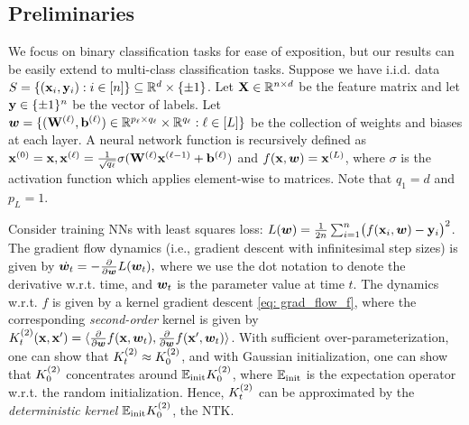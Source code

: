 
\subsection{Preliminaries}

We focus on binary classification tasks for ease of exposition, but our results can be easily extend to multi-class classification tasks. 
Suppose we have i.i.d. data $S = \{({\mathbf{x}}_i, {\mathbf{y}}_i): i\in [n]\} \subseteq \mathbb{R}^d \times \{\pm 1\}$. 
Let ${\mathbf{X}} \in \mathbb{R}^{n\times d}$ be the feature matrix and let ${\mathbf{y}} \in \{\pm 1\}^n$ be the vector of labels.
Let ${\boldsymbol{w}} = \{({\mathbf{W}} ^{(\ell)}, {\mathbf{b}}^{(\ell)})\in {\mathbb{R}}^{p_\ell \times q_\ell}\times{\mathbb{R}}^{q_\ell}: \ell \in [L]\}$ be the collection of weights and biases at each layer. A neural network function is recursively defined as ${\mathbf{x}}^{{}(0)} = {\mathbf{x}}, {\mathbf{x}}^{{}(\ell)}  = \frac{1}{\sqrt{q_\ell}} \sigma({\mathbf{W}}^{{}(\ell)} {\mathbf{x}}^{{}(\ell-1)} + {\mathbf{b}}^{{}(\ell)})$ and $f({\mathbf{x}}, {\boldsymbol{w}})	 = {\mathbf{x}}^{{}(L)}$, 
where $\sigma$ is the activation function which applies element-wise to matrices. Note that $q_1 = d$ and $p_L = 1$. 


Consider training NNs with least squares loss: $L({\boldsymbol{w}}) = \frac{1}{2n} \sum_{i=1}^n \bigl(f({\mathbf{x}}_i, {\boldsymbol{w}})- {\mathbf{y}}_i\bigr)^2$.
The gradient flow dynamics (i.e., gradient descent with infinitesimal step sizes) is given by $\dot{{\boldsymbol{w}}_t} = - \frac{\partial}{\partial {\boldsymbol{w}}} L({\boldsymbol{w}}_t),$
where we use the dot notation to denote the derivative w.r.t. time, and ${\boldsymbol{w}}_t$ is the parameter value at time $t$. The dynamics w.r.t. $f$ is given by a kernel gradient descent \eqref{eq: grad_flow_f}, 
where the corresponding \emph{second-order} kernel is given by ${K}^{(2)}_t({\mathbf{x}}, {\mathbf{x}}') =  \langle \frac{\partial}{\partial {\boldsymbol{w}}} f({\mathbf{x}}, {\boldsymbol{w}}_t), \frac{\partial}{\partial {\boldsymbol{w}}} f({\mathbf{x}}', {\boldsymbol{w}}_t)  \rangle$.
With sufficient over-parameterization, one can show that ${K}^{(2)}_t \approx {K}^{(2)}_0$, and with Gaussian initialization, one can show that ${K}^{(2)}_0$ concentrates around ${\mathbb{E}}_{\textnormal{init}} {K}^{(2)}_0$, {where ${\mathbb{E}}_{\textnormal{init}}$ is the expectation operator w.r.t. the random initialization}. Hence, ${K}^{(2)}_t$ can be approximated by the \emph{deterministic kernel} ${\mathbb{E}}_{\textnormal{init}} {K}^{(2)}_0$, the NTK.

